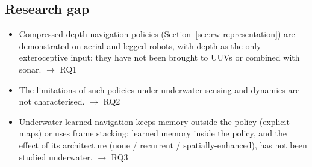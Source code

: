 \subsection{Research gap}
\label{sec:rw-gap}
\begin{itemize}
    \item Compressed-depth navigation policies (Section~\ref{sec:rw-representation}) are demonstrated on aerial and
          legged robots, with depth as the only exteroceptive input; they have not been
          brought to UUVs or combined with sonar. $\rightarrow$ RQ1
    \item The limitations of such policies under underwater sensing and dynamics are
          not characterised. $\rightarrow$ RQ2
    \item Underwater learned navigation keeps memory outside the policy (explicit maps)
          or uses frame stacking; learned memory inside the policy, and the effect of
          its architecture (none / recurrent / spatially-enhanced), has not been
          studied underwater. $\rightarrow$ RQ3
\end{itemize}
